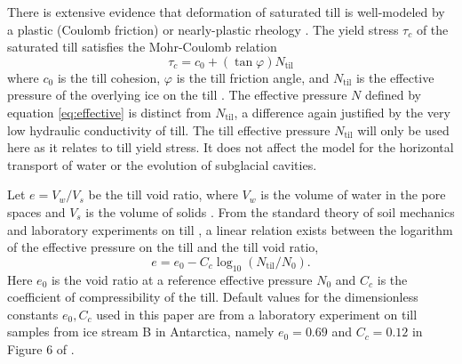 \documentclass[11pt,final]{amsart}
\begin{document}
There is extensive evidence that deformation of saturated till is well-modeled by a plastic (Coulomb friction) or nearly-plastic rheology \citep{Hookeetal1997,SchoofTill,TrufferHarrisonEchelmeyer2000,Tulaczyketal2000}.  The yield stress $\tau_c$ of the saturated till satisfies the Mohr-Coulomb relation
\newcommand{\Ntil}{N_{\text{til}}}
\begin{equation}
\tau_c = c_0 + (\tan \varphi) \Ntil  \label{eq:mohrcoulomb}
\end{equation}
where $c_0$ is the till cohesion, $\varphi$ is the till friction angle, and $\Ntil$ is the effective pressure of the overlying ice on the till \citep{BBssasliding,Paterson}.  The effective pressure $N$ defined by equation \eqref{eq:effective} is distinct from $\Ntil$, a difference again justified by the very low hydraulic conductivity of till.  The till effective pressure $\Ntil$ will only be used here as it relates to till yield stress.  It does not affect the model for the horizontal transport of water or the evolution of subglacial cavities.

Let $e = V_w / V_s$ be the till void ratio, where $V_w$ is the volume of water in the pore spaces and $V_s$ is the volume of solids \citep{Tulaczyketal2000}.  From the standard theory of soil mechanics and laboratory experiments on till \citep{Hookeetal1997,Tulaczyketal2000}, a linear relation exists between the logarithm of the effective pressure on the till and the till void ratio,
\begin{equation}
e = e_0 - C_c \log_{10}\left(\Ntil / N_0\right).  \label{eq:voidpressure}
\end{equation}
Here $e_0$ is the void ratio at a reference effective pressure $N_0$ and $C_c$ is the coefficient of compressibility of the till.  Default values for the dimensionless constants $e_0,C_c$ used in this paper are from a laboratory experiment on till samples from ice stream B in Antarctica, namely $e_0=0.69$ and $C_c=0.12$ in Figure 6 of \cite{Tulaczyketal2000}.
\end{document}
